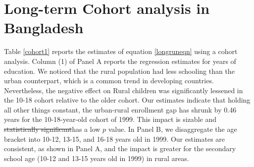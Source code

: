 \documentclass[12pt,letterpaper]{article}
\newcommand{\0}{\ensuremath{\mbox{\boldmath $0$}}}
\begin{document}
\section{Long-term Cohort analysis in Bangladesh\label{sec.long-term}}


Table \ref{cohort1} reports the estimates of equation \ref{longruneqn} using a cohort analysis. Column (1) of Panel A reports the regression estimates for years of education. We noticed that the rural population had less schooling than the urban counterpart, which is a common trend in developing countries. Nevertheless, the negative effect on Rural children was significantly lessened in the 10-18 cohort relative to the older cohort. Our estimates indicate that holding all other things constant, the urban-rural enrollment gap has shrunk by 0.46 years for the 10-18-year-old cohort of 1999. This impact is sizable and \sout{statistically significant}has a low $p$ value. In Panel B, we disaggregate the age bracket into 10-12, 13-15, and 16-18 years old in 1999. Our estimates are consistent, as shown in Panel A, and the impact is greater for the secondary school age (10-12 and 13-15 years old in 1999) in rural areas. 

\end{document}
